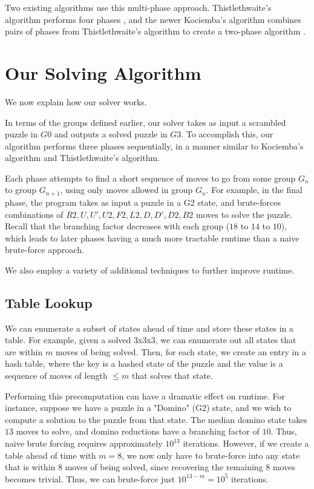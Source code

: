 \documentclass{article}
\begin{document}
Two existing algorithms use this multi-phase approach. Thistlethwaite's algorithm performs four phases \cite{thistle}, and the newer Kociemba's algorithm combines pairs of phases from Thistlethwaite's algorithm to create a two-phase algorithm \cite{kociemba-2phase}. %

\section{Our Solving Algorithm}

We now explain how our solver works.

In terms of the groups defined earlier, our solver takes as input a scrambled puzzle in $G0$ and outputs a solved puzzle in $G3$. To accomplish this, our algorithm performs three phases sequentially, in a manner similar to Kociemba's algorithm and Thistlethwaite's algorithm.

Each phase attempts to find a short sequence of moves to go from some group $G_n$ to group $G_{n+1}$, using only moves allowed in group $G_n$. For example, in the final phase, the program takes as input a puzzle in a G2 state, and brute-forces combinations of $R2, U, U', U2, F2, L2, D, D', D2, B2$ moves to solve the puzzle. Recall that the branching factor decreases with each group ($18$ to $14$ to $10$), which leads to later phases having a much more tractable runtime than a naive brute-force approach.

We also employ a variety of additional techniques to further improve runtime.

\subsection{Table Lookup}

We can enumerate a subset of states ahead of time and store these states in a table. For example, given a solved 3x3x3, we can enumerate out all states that are within $m$ moves of being solved. Then, for each state, we create an entry in a hash table, where the key is a hashed state of the puzzle and the value is a sequence of moves of length $\leq m$ that solves that state.

Performing this precomputation can have a dramatic effect on runtime. For instance, suppose we have a puzzle in a "Domino" (G2) state, and we wish to compute a solution to the puzzle from that state. The median domino state takes $13$ moves to solve, and domino reductions have a branching factor of $10$. Thus, naive brute forcing requires approximately $10^{13}$ iterations. However, if we create a table ahead of time with $m=8$, we now only have to brute-force into any state that is within $8$ moves of being solved, since recovering the remaining $8$ moves becomes trivial. Thus, we can brute-force just $10^{13-m} = 10^5$ iterations.
\end{document}
